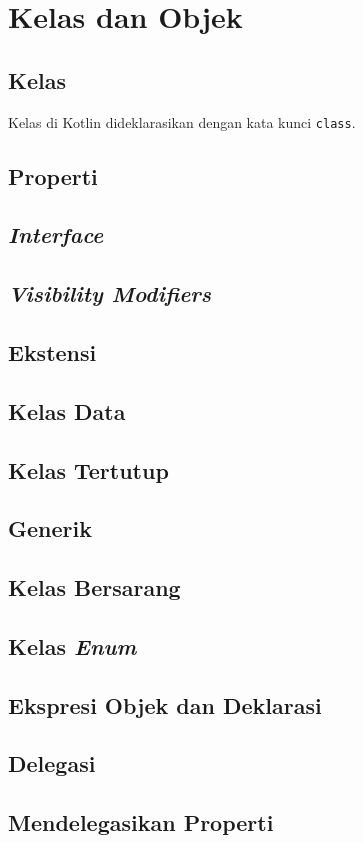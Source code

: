 \chapter{Kelas dan Objek}

\section{Kelas}

Kelas di Kotlin dideklarasikan dengan kata kunci \texttt{class}.

\section{Properti}

\section{\textit{Interface}}

\section{\textit{Visibility Modifiers}}

\section{Ekstensi}

\section{Kelas Data}

\section{Kelas Tertutup}

\section{Generik}

\section{Kelas Bersarang}

\section{Kelas \textit{Enum}}

\section{Ekspresi Objek dan Deklarasi}

\section{Delegasi}

\section{Mendelegasikan Properti}